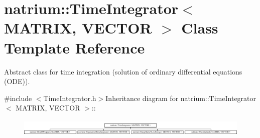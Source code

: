 \hypertarget{classnatrium_1_1TimeIntegrator}{
\section{natrium::TimeIntegrator$<$ MATRIX, VECTOR $>$ Class Template Reference}
\label{classnatrium_1_1TimeIntegrator}
}


Abstract class for time integration (solution of ordinary differential equations (ODE)).  


{\ttfamily \#include $<$TimeIntegrator.h$>$}Inheritance diagram for natrium::TimeIntegrator$<$ MATRIX, VECTOR $>$::\begin{figure}[H]
\begin{center}
\leavevmode
\includegraphics[height=0.816327cm]{classnatrium_1_1TimeIntegrator}
\end{center}
\end{figure}
